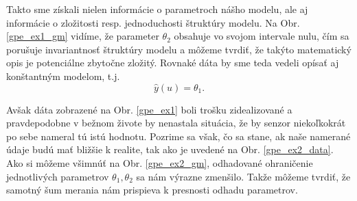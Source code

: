 Takto sme získali nielen informácie o parametroch nášho modelu, ale aj informácie o zložitosti resp. jednoduchosti štruktúry modelu. Na Obr. \ref{gpe_ex1_gm} vidíme, že parameter $ \theta_2 $ obsahuje vo svojom intervale nulu, čím sa porušuje invariantnosť štruktúry modelu a môžeme tvrdiť, že takýto matematický opis je potenciálne zbytočne zložitý. Rovnaké dáta by sme teda vedeli opísať aj konštantným modelom, t.j. 
\begin{equation}
	\hat{y}(u) = \theta_1.
\end{equation}

 Avšak dáta zobrazené na Obr. \ref{gpe_ex1} boli trošku zidealizované a pravdepodobne v bežnom živote by nenastala situácia, že by senzor niekoľkokrát po sebe nameral tú istú hodnotu. Pozrime sa však, čo sa stane, ak naše namerané údaje budú mať bližšie k realite, tak ako je uvedené na Obr. \ref{gpe_ex2_data}. Ako si môžeme všimnúť na Obr. \ref{gpe_ex2_gm}, odhadované ohraničenie jednotlivých parametrov $ \theta_1, \theta_2 $ sa nám výrazne zmenšilo. Takže môžeme tvrdiť, že samotný šum merania nám prispieva k presnosti odhadu parametrov. 

